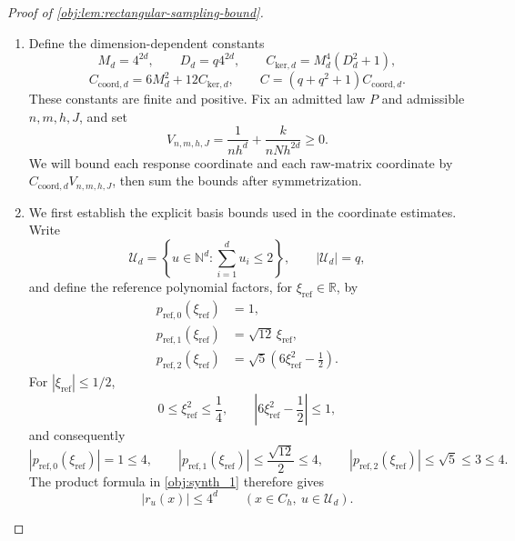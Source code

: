 \begin{proof}[Proof of \cref{obj:lem:rectangular-sampling-bound}]
\begin{enumerate}
\item Define the dimension-dependent constants
\[
M_d=4^{2d},\qquad
D_d=q4^{2d},\qquad
C_{\mathrm{ker},d}=M_d^4(D_d^2+1),
\]
\[
C_{\mathrm{coord},d}=6M_d^2+12C_{\mathrm{ker},d},
\qquad
C=(q+q^2+1)C_{\mathrm{coord},d}.
\]
These constants are finite and positive. Fix an admitted law \(P\) and admissible \(n,m,h,J\), and set
\[
V_{n,m,h,J}
=\frac{1}{nh^d}+\frac{k}{nNh^{2d}}\ge0.
\]
We will bound each response coordinate and each raw-matrix coordinate by
\(C_{\mathrm{coord},d}V_{n,m,h,J}\), then sum the bounds after symmetrization.

\item We first establish the explicit basis bounds used in the coordinate estimates. Write
\[
\mathcal U_d
=\left\{u\in\mathbb N^d:\sum_{i=1}^d u_i\le2\right\},
\qquad |\mathcal U_d|=q,
\]
and define the reference polynomial factors, for \(\xi_{\mathrm{ref}}\in\mathbb R\), by
\[
\begin{aligned}
p_{\mathrm{ref},0}(\xi_{\mathrm{ref}})&=1,\\
p_{\mathrm{ref},1}(\xi_{\mathrm{ref}})&=\sqrt{12}\,\xi_{\mathrm{ref}},\\
p_{\mathrm{ref},2}(\xi_{\mathrm{ref}})
&=\sqrt5\left(6\xi_{\mathrm{ref}}^2-\frac12\right).
\end{aligned}
\]
For \(|\xi_{\mathrm{ref}}|\le1/2\),
\[
0\le\xi_{\mathrm{ref}}^2\le\frac14,
\qquad
\left|6\xi_{\mathrm{ref}}^2-\frac12\right|\le1,
\]
and consequently
\[
|p_{\mathrm{ref},0}(\xi_{\mathrm{ref}})|=1\le4,\qquad
|p_{\mathrm{ref},1}(\xi_{\mathrm{ref}})|
\le\frac{\sqrt{12}}2\le4,\qquad
|p_{\mathrm{ref},2}(\xi_{\mathrm{ref}})|\le\sqrt5\le3\le4.
\]
The product formula in \cref{obj:synth_1} therefore gives
\[
|r_u(x)|\le4^d
\qquad(x\in C_h,\ u\in\mathcal U_d).
\]


\end{enumerate}
\end{proof}
